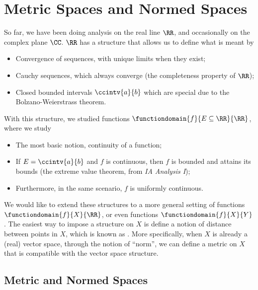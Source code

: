 \section{Metric Spaces and Normed Spaces}

So far, we have been doing analysis on the real line \(\RR\), and occasionally on the complex plane \(\CC\). \(\RR\) has a structure that allows us to define what is meant by
\begin{itemize}
    \item Convergence of sequences, with unique limits when they exist;
    \item Cauchy sequences, which always converge (the completeness property of \(\RR\));
    \item Closed bounded intervals \(\ccintv{a}{b}\) which are special due to the Bolzano-Weierstrass theorem.
\end{itemize}

With this structure, we studied functions \(\functiondomain{f}{E \subseteq \RR}{\RR}\), where we study
\begin{itemize}
    \item The most basic notion, continuity of a function;
    \item If \(E = \ccintv{a}{b}\) and \(f\) is continuous, then \(f\) is bounded and attains its bounds (the extreme value theorem, from \textit{IA Analysis I});
    \item Furthermore, in the same scenario, \(f\) is uniformly continuous.
\end{itemize}

We would like to extend these structures to a more general setting of functions \(\functiondomain{f}{X}{\RR}\), or even functions \(\functiondomain{f}{X}{Y}\). The easiest way to impose a structure on \(X\) is define a notion of distance between points in \(X\), which is known as . More specifically, when \(X\) is already a (real) vector space, through the notion of ``norm'', we can define a metric on \(X\) that is compatible with the vector space structure.

\subsection{Metric and Normed Spaces}

